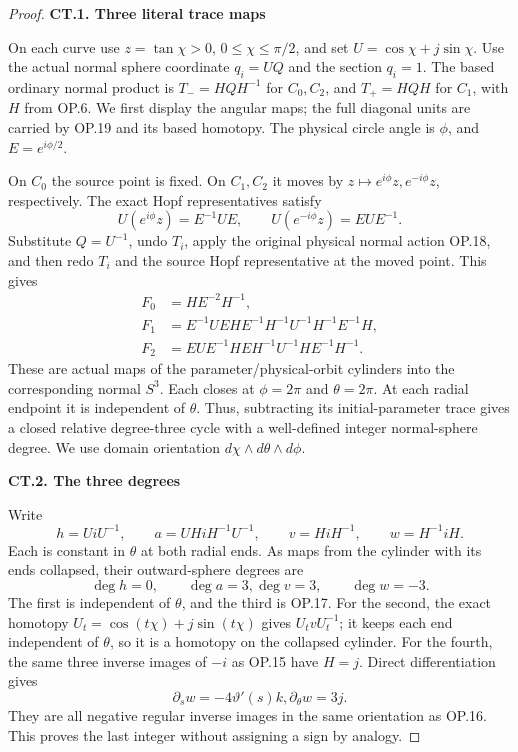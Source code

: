 \begin{proof}
\par

\medskip\noindent\textbf{CT.1. Three literal trace maps}

\par\nobreak

On each curve use \(z=\tan\chi>0\), \(0\leq\chi\leq\pi/2\),
and set \(U=\cos\chi+j\sin\chi\). Use the actual normal sphere
coordinate \(q_i=UQ\) and the section \(q_i=1\). The based ordinary
normal product is \(T_-=HQH^{-1}\) for \(C_0,C_2\), and
\(T_+=HQH\) for \(C_1\), with \(H\) from OP.6. We first display
the angular maps; the full diagonal units are carried by OP.19 and
its based homotopy. The physical circle angle is \(\phi\), and
\(E=e^{i\phi/2}\).

On \(C_0\) the source point is fixed. On \(C_1,C_2\) it moves
by \(z\mapsto e^{i\phi}z,e^{-i\phi}z\), respectively. The exact
Hopf representatives satisfy
\[
 U(e^{i\phi}z)=E^{-1}UE,\qquad
 U(e^{-i\phi}z)=EUE^{-1}.                         \tag{CT.1}
\]
Substitute \(Q=U^{-1}\), undo \(T_i\), apply the original
physical normal action OP.18, and then redo \(T_i\) and the
source Hopf representative at the moved point. This gives
\[
 \begin{aligned}
 F_0&=H E^{-2}H^{-1},\\
 F_1&=E^{-1}UEH E^{-1}H^{-1}U^{-1}H^{-1}E^{-1}H,\\
 F_2&=EUE^{-1}H E H^{-1}U^{-1}H E^{-1}H^{-1}.
 \end{aligned}                                           \tag{CT.2}
\]
These are actual maps of the parameter/physical-orbit cylinders into
the corresponding normal \(S^3\). Each closes at \(\phi=2\pi\)
and \(\theta=2\pi\). At each radial endpoint it is independent
of \(\theta\). Thus, subtracting its initial-parameter trace gives
a closed relative degree-three cycle with a well-defined integer
normal-sphere degree. We use domain orientation
\(d\chi\wedge d\theta\wedge d\phi\).

\par

\medskip\noindent\textbf{CT.2. The three degrees}

\par\nobreak

Write
\[
 h=UiU^{-1},\qquad a=UHiH^{-1}U^{-1},\qquad
 v=HiH^{-1},\qquad w=H^{-1}iH.
\]
Each is constant in \(\theta\) at both radial ends. As maps from
the cylinder with its ends collapsed, their outward-sphere degrees
are
\[
             \deg h=0,\qquad \deg a=3,
             \deg v=3,\qquad \deg w=-3.             \tag{CT.3}
\]
The first is independent of \(\theta\), and the third is OP.17.
For the second, the exact homotopy
\(U_t=\cos(t\chi)+j\sin(t\chi)\) gives
\(U_tvU_t^{-1}\); it keeps each end independent of \(\theta\),
so it is a homotopy on the collapsed cylinder. For the fourth, the
same three inverse images of \(-i\) as OP.15 have \(H=j\).
Direct differentiation gives
\[
             \partial_s w=-4\vartheta'(s)k,
             \partial_\theta w=3j.
\]
They are all negative regular inverse images in the same orientation
as OP.16. This proves the last integer without assigning a sign by
analogy.


\end{proof}
